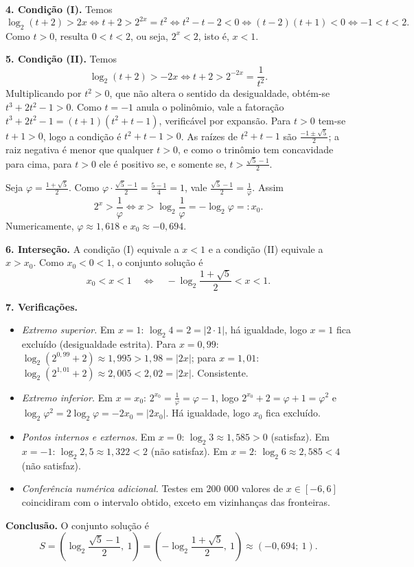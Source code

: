 \documentclass{article}%
\begin{document}
\textbf{4. Condição (I).} Temos
\[
\log_2(t+2)>2x \iff t+2>2^{2x}=t^2 \iff t^2-t-2<0 \iff (t-2)(t+1)<0 \iff -1<t<2.
\]
Como $t>0$, resulta $0<t<2$, ou seja, $2^x<2$, isto é, $x<1$.

\textbf{5. Condição (II).} Temos
\[
\log_2(t+2)>-2x \iff t+2>2^{-2x}=\frac{1}{t^2}.
\]
Multiplicando por $t^2>0$, que não altera o sentido da desigualdade, obtém-se $t^3+2t^2-1>0$. Como $t=-1$ anula o polinômio, vale a fatoração $t^3+2t^2-1=(t+1)(t^2+t-1)$, verificável por expansão. Para $t>0$ tem-se $t+1>0$, logo a condição é $t^2+t-1>0$. As raízes de $t^2+t-1$ são $\frac{-1\pm\sqrt{5}}{2}$; a raiz negativa é menor que qualquer $t>0$, e como o trinômio tem concavidade para cima, para $t>0$ ele é positivo se, e somente se, $t>\frac{\sqrt{5}-1}{2}$.

Seja $\varphi=\frac{1+\sqrt{5}}{2}$. Como $\varphi\cdot\frac{\sqrt{5}-1}{2}=\frac{5-1}{4}=1$, vale $\frac{\sqrt{5}-1}{2}=\frac{1}{\varphi}$. Assim
\[
2^x>\frac{1}{\varphi}\iff x>\log_2\frac{1}{\varphi}=-\log_2\varphi=:x_0.
\]
Numericamente, $\varphi\approx 1{,}618$ e $x_0\approx -0{,}694$.

\textbf{6. Interseção.} A condição (I) equivale a $x<1$ e a condição (II) equivale a $x>x_0$. Como $x_0<0<1$, o conjunto solução é
\[
x_0<x<1 \quad\Longleftrightarrow\quad -\log_2\frac{1+\sqrt{5}}{2}<x<1.
\]

\textbf{7. Verificações.}
\begin{itemize}
\item \textit{Extremo superior.} Em $x=1$: $\log_2 4=2=|2\cdot 1|$, há igualdade, logo $x=1$ fica excluído (desigualdade estrita). Para $x=0{,}99$: $\log_2(2^{0,99}+2)\approx 1{,}995>1{,}98=|2x|$; para $x=1{,}01$: $\log_2(2^{1,01}+2)\approx 2{,}005<2{,}02=|2x|$. Consistente.
\item \textit{Extremo inferior.} Em $x=x_0$: $2^{x_0}=\frac{1}{\varphi}=\varphi-1$, logo $2^{x_0}+2=\varphi+1=\varphi^2$ e $\log_2\varphi^2=2\log_2\varphi=-2x_0=|2x_0|$. Há igualdade, logo $x_0$ fica excluído.
\item \textit{Pontos internos e externos.} Em $x=0$: $\log_2 3\approx 1{,}585>0$ (satisfaz). Em $x=-1$: $\log_2 2{,}5\approx 1{,}322<2$ (não satisfaz). Em $x=2$: $\log_2 6\approx 2{,}585<4$ (não satisfaz).
\item \textit{Conferência numérica adicional.} Testes em 200 000 valores de $x\in[-6,6]$ coincidiram com o intervalo obtido, exceto em vizinhanças das fronteiras.
\end{itemize}

\textbf{Conclusão.} O conjunto solução é
\[
S=\left(\log_2\frac{\sqrt{5}-1}{2},\ 1\right)=\left(-\log_2\frac{1+\sqrt{5}}{2},\ 1\right)\approx(-0{,}694;\ 1).
\]
\end{document}
